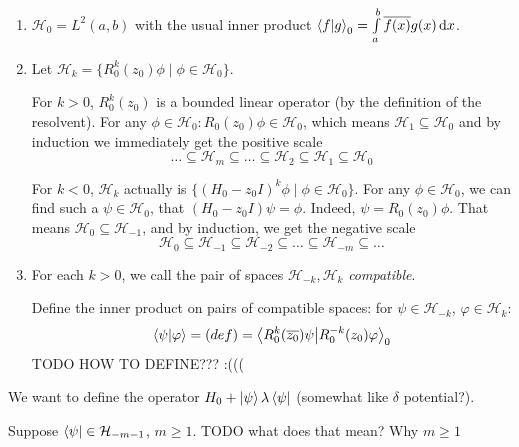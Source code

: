 \documentclass[12pt, a4paper]{article}
\newcommand{\hilb}[1]{\mathcal{H}_{#1}}
\newcommand{\cconj}[1]{\overline{#1}}
\begin{document}
\begin{enumerate}
\item $\hilb{0} = L^2(a, b)$ with the usual inner product $\ip{f}{g}_0 = \int\limits_a^b \cconj{f(x)} g(x) \dd{x}$.
\item Let $\hilb{k} = \{ R^k_0(z_0) \phi \mid \phi \in \hilb{0} \}$.

For $k > 0$, $R_0^k(z_0)$ is a bounded linear operator (by the definition of the resolvent). For any $\phi \in \hilb{0}: R_0(z_0) \phi \in \hilb{0}$, which means $\hilb{1} \subseteq \hilb{0}$ and by induction we immediately get the positive scale
\[
\dots \subseteq \hilb{m} \subseteq \dots \subseteq \hilb{2} \subseteq \hilb{1} \subseteq \hilb{0}
\] 

For $k < 0$, $\hilb{k}$ actually is $\{ (H_0 - z_0 I)^k \phi \mid \phi \in \hilb{0} \}$.
For any $\phi \in \hilb{0}$, we can find such a $\psi \in \hilb{0}$, that $(H_0 - z_0 I) \psi = \phi$. Indeed, $\psi = R_0(z_0) \phi$. That means $\hilb{0} \subseteq \hilb{-1}$, and by induction, we get the negative scale
\[
\hilb{0} \subseteq \hilb{-1} \subseteq \hilb{-2} \subseteq \dots \subseteq \hilb{-m} \subseteq \dots
\] 
\item For each $k > 0$, we call the pair of spaces $\hilb{-k}, \hilb{k}$ \textit{compatible}.

Define the inner product on pairs of compatible spaces: for $\psi \in \hilb{-k}$, $\varphi \in \hilb{k}$:
\[
\ip{\psi}{\varphi} = (def) = \ip{R_0^k(\cconj{z_0}) \psi}{R_0^{-k}(z_0)\varphi}_0
\]
TODO HOW TO DEFINE??? :(((
\begin{comment}
\begin{itemize}
\item Axioms are kind of obvious
\item Existence: $\psi = R_0^{-k}(z_0) \phi_1$, $\varphi = R_0^k(z_0) \phi_2$, therefore \\
$\ip{\psi}{\varphi} = \ip{R_0^k(\cconj{z_0}) R_0^{-k}(z_0) \phi_1}{R_0^{-k}(z_0) R_0^k(z_0) \phi_2}$
\end{itemize}
\end{comment}

\end{enumerate}

We want to define the operator $H_0 + \ket{\psi} \lambda \bra{\psi}$ (somewhat like $\delta$ potential?).

Suppose $\bra{\psi} \in \hilb{-m - 1}$, $m \ge 1$. TODO what does that mean? Why $m \ge 1$
\end{document}
